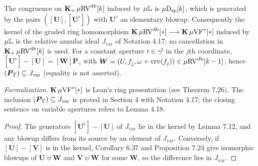 \setcounter{theorem}{24}
\begin{remark}
\label{thekernel}
\leanok
{}
The congruence on $\operatorname{\mathbf{K}_+} \mu\mathrm{RV}^{\operatorname{db}}[k]$ induced by $\mu\mathbb{L}$ is $\mu\mathrm{D}_{\mathrm{sp}}[k]$, which is generated by the pairs $([\boldsymbol{U}], [\boldsymbol{U}^\flat])$ with $\boldsymbol{U}^\flat$ an elementary blowup. Consequently the kernel of the graded ring homomorphism $\operatorname{\mathbf{K}} \mu\mathrm{RV}^{\operatorname{db}}[*] \longrightarrow \operatorname{\mathbf{K}} \mu\mathrm{VF}^\diamond[*]$ induced by $\mu\mathbb{L}$ is the relative annular ideal $J_{\mathrm{var}}$ of Notation 4.17; no cancellation in $\operatorname{\mathbf{K}_+} \mu\mathrm{RV}^{\operatorname{db}}[k]$ is used. For a constant aperture $t \in \gamma^\sharp$ in the $j$th coordinate, $[\boldsymbol{U}^\flat] - [\boldsymbol{U}] = [\boldsymbol{W}] \boldsymbol{P}_\gamma$ with $\boldsymbol{W} = (U, f_{\tilde j}, \omega + \operatorname{vrv}(f_j)) \in \mu\mathrm{RV}^{\operatorname{db}}[k-1]$, hence $(\boldsymbol{P}_\Gamma) \subseteq J_{\mathrm{var}}$ (equality is not asserted).

\emph{Formalization.} $\operatorname{\mathbf{K}} \mu\mathrm{VF}^\diamond[*]$ is Lean's ring presentation (see Theorem 7.26). The inclusion $(\boldsymbol{P}_\Gamma) \subseteq J_{\mathrm{var}}$ is proved in Section 4 with Notation 4.17; the closing sentence on variable apertures refers to Lemma 4.18.
\end{remark}

\begin{proof}
\leanok
The generators $[\boldsymbol{U}^\flat] - [\boldsymbol{U}]$ of $J_{\mathrm{var}}$ lie in the kernel by Lemma 7.12, and any blowup differs from its source by an element of $J_{\mathrm{var}}$. Conversely, if $[\boldsymbol{U}] - [\boldsymbol{V}]$ is in the kernel, Corollary 6.37 and Proposition 7.24 give isomorphic blowups of $\boldsymbol{U} \uplus \boldsymbol{W}$ and $\boldsymbol{V} \uplus \boldsymbol{W}$ for some $\boldsymbol{W}$, so the difference lies in $J_{\mathrm{var}}$.
\end{proof}

